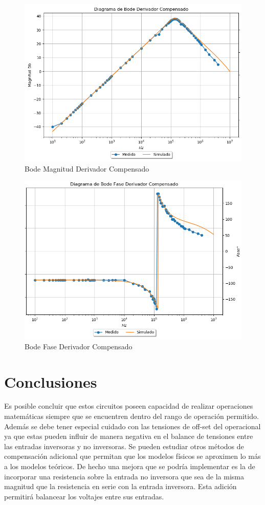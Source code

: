 \begin{figure}[H]
	\centering
	\includegraphics[width=\textwidth]{Ejercicio4/SUPERPOSICION-BODE-DERIVADOR-COMPENSADO} 
	\caption{Bode Magnitud Derivador Compensado}
\end{figure}

\begin{figure}[H]
	\centering
	\includegraphics[width=\textwidth]{Ejercicio4/SUPERPOSICION-FASE-DERIVADOR-COMPENSADO} 
	\caption{Bode Fase Derivador Compensado}
\end{figure}

\section{Conclusiones}
Es posible concluir que estos circuitos poseen capacidad de realizar operaciones matemáticas siempre que se encuentren dentro del rango de operación permitido. 
Además se debe tener especial cuidado con las tensiones de off-set del operacional ya que estas pueden influir de manera negativa en el balance de tensiones entre las entradas inversoras y no inversoras. Se pueden estudiar otros métodos de compensación adicional que permitan que los modelos físicos se aproximen lo más a los modelos teóricos. De hecho una mejora que se podría implementar es la de incorporar una resistencia sobre la entrada no inversora que sea de la misma magnitud que la resistencia en serie con la entrada inversora. Esta adición permitirá balancear los voltajes entre sus entradas.   
